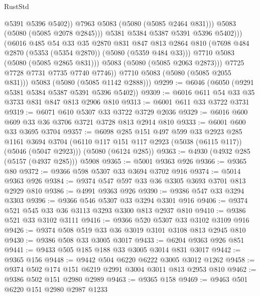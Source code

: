 \begin{lexlean}{RustStd}
\begin{coremodule}
{\begin{coremodule}
{{{{{                            @5391
                            @5396
                            @5402))
                        @7963
                        @5083
                        (@5080 (@5085 @2464 @831)))
                      @5083
                      (@5080 (@5085 @2078 @2845)))
                    @5381
                    @5384
                    @5387
                    @5391
                    @5396
                    @5402)))
              (@6016
                @485
                @54
                @33
                @35
                @2870
                @831
                @847
                @813
                @2864
                @810
                (@7698 @484 @2870 (@5353 (@5354 @2870)) (@5080 (@5359 @484 @33)))
                @7710
                @5083
                (@5080 (@5085 @2865 @831)))
              @5083
              (@5080 (@5085 @2063 @2873)))
            @7725
            @7728
            @7731
            @7735
            @7740
            @7746))
        @7710
        @5083
        (@5080 (@5085 @2055 @831)))
      @5083
      (@5080 (@5085 @1142 @2888)))
@9299 := @6046 (@6050 (@9291 @5381 @5384 @5387 @5391 @5396 @5402))
@9309 := @6016 @611 @54 @33 @35 @3733 @831 @847 @813 @2906 @810
@9313 := @6001 @611 @33 @3722 @3731
@9319 := @6071 @610 @5307 @33 @3722 @3729 @2036
@9329 := @6016 @600 @609 @33 @36 @3706 @3721 @3728 @813 @2914 @810
@9333 := @6001 @600 @33 @3695 @3704
@9357 := @6098
    @285
    @151
    @497
    @599
    @33
    @2923
    @285
    @1161
    @3694
    @3704
    (@6110 @117 @151 @117 @2923 (@5038 (@6115 @117)) (@5046 (@5047 @2923)))
    (@5080 (@6124 @285))
@9363 := @4930 (@4932 @285 (@5157 (@4937 @285))) @5908
@9365 := @5001 @9363 @926
@9366 := @9365 @80
@9372 := @9366 @598 @5307 @33 @3694 @3702 @916
@9374 := @5014 @9363 @926
@9384 := @9374 @547 @597 @33 @36 @3305 @3693 @3701 @813 @2929 @810
@9386 := @4991 @9363 @926
@9390 := @9386 @547 @33 @3294 @3303
@9396 := @9366 @546 @5307 @33 @3294 @3301 @916
@9406 := @9374 @521 @545 @33 @36 @3113 @3293 @3300 @813 @2937 @810
@9410 := @9386 @521 @33 @3102 @3111
@9416 := @9366 @520 @5307 @33 @3102 @3109 @916
@9426 := @9374 @508 @519 @33 @36 @3019 @3101 @3108 @813 @2945 @810
@9430 := @9386 @508 @33 @3005 @3017
@9433 := @6204 @9363 @926 @851
@9441 := @9433 @505 @185 @188 @33 @3005 @3014 @831 @3017
@9442 := @9365 @156
@9448 := @9442 @504 @6220 @6222 @3005 @3012 @1262
@9458 := @9374 @502 @174 @151 @6219 @2991 @3004 @3011 @813 @2953 @810
@9462 := @9386 @502 @151 @2980 @2989
@9463 := @9365 @158
@9469 := @9463 @501 @6220 @151 @2980 @2987 @1233
}}}}}
\end{coremodule}}
\end{coremodule}
\end{lexlean}
